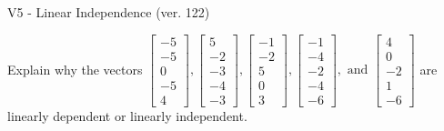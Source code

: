 \begin{exercise}
  \begin{exerciseTitle}V5 - Linear Independence (ver. 122)\end{exerciseTitle}
  \begin{exerciseStatement}
    Explain why the vectors \(\left[\begin{array}{r}
-5 \\
-5 \\
0 \\
-5 \\
4
\end{array}\right] , \left[\begin{array}{r}
5 \\
-2 \\
-3 \\
-4 \\
-3
\end{array}\right] , \left[\begin{array}{r}
-1 \\
-2 \\
5 \\
0 \\
3
\end{array}\right] , \left[\begin{array}{r}
-1 \\
-4 \\
-2 \\
-4 \\
-6
\end{array}\right] , \text{ and } \left[\begin{array}{r}
4 \\
0 \\
-2 \\
1 \\
-6
\end{array}\right]\) are linearly dependent or linearly independent.	



\end{exerciseStatement}
\end{exercise}
